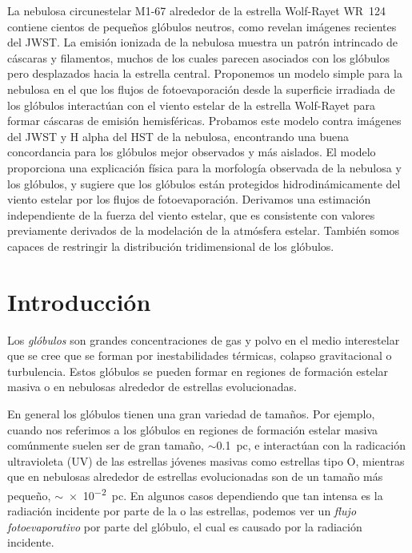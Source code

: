 \documentclass{book}
\begin{document}
La nebulosa circunestelar M1-67 alrededor de la estrella Wolf-Rayet WR~124 contiene cientos de pequeños glóbulos neutros, como revelan imágenes recientes del JWST. La emisión ionizada de la nebulosa muestra un patrón intrincado de cáscaras y filamentos, muchos de los cuales parecen asociados con los glóbulos pero desplazados hacia la estrella central. Proponemos un modelo simple para la nebulosa en el que los flujos de fotoevaporación desde la superficie irradiada de los glóbulos interactúan con el viento estelar de la estrella Wolf-Rayet para formar cáscaras de emisión hemisféricas. Probamos este modelo contra imágenes del JWST y H alpha del HST de la nebulosa, encontrando una buena concordancia para los glóbulos mejor observados y más aislados. El modelo proporciona una explicación física para la morfología observada de la nebulosa y los glóbulos, y sugiere que los glóbulos están protegidos hidrodinámicamente del viento estelar por los flujos de fotoevaporación. Derivamos una estimación independiente de la fuerza del viento estelar, que es consistente con valores previamente derivados de la modelación de la atmósfera estelar. También somos capaces de restringir la distribución tridimensional de los glóbulos.

\newpage

\tableofcontents

\newpage

\chapter{Introducción}

Los \textit{glóbulos} son grandes concentraciones de gas y polvo en el medio interestelar que se cree que se forman por inestabilidades térmicas, colapso gravitacional o turbulencia. Estos glóbulos se pueden formar en regiones de formación estelar masiva o en nebulosas alrededor de estrellas evolucionadas.

En general los glóbulos tienen una gran variedad de tamaños. Por ejemplo, cuando nos referimos a los glóbulos en regiones de formación estelar masiva comúnmente suelen ser de gran tamaño, $\sim$\SI{0.1}{pc}, e interactúan con la radicación ultravioleta (UV) de las estrellas jóvenes masivas como estrellas tipo O, mientras que en nebulosas alrededor de estrellas evolucionadas son de un tamaño más pequeño, $\sim$\SI{e-2}{pc}. En algunos casos dependiendo que tan intensa es la radiación incidente por parte de la o las estrellas, podemos ver un \textit{flujo fotoevaporativo} por parte del glóbulo, el cual es causado por la radiación incidente.
\end{document}
